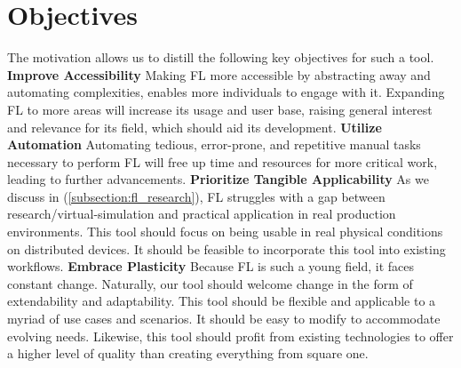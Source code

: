 \section{Objectives}

The motivation allows us to distill the following key objectives for such a tool.
\vspace{5mm}
\newline
\textbf{Improve Accessibility}\newline
Making FL more accessible by abstracting away and automating complexities,
enables more individuals to engage with it.
Expanding FL to more areas will increase its usage and user base,
raising general interest and relevance for its field,
which should aid its development.
\vspace{5mm}
\newline
\textbf{Utilize Automation}\newline
Automating tedious, error-prone, and repetitive manual tasks necessary
to perform FL will free up time and resources for more critical work,
leading to further advancements.
\vspace{5mm}
\newline
\textbf{Prioritize Tangible Applicability}\newline
As we discuss in (\ref{subsection:fl_research}), FL struggles with a gap
between research/virtual-simulation and practical application in real production environments.
This tool should focus on being usable in real physical conditions on distributed devices.
It should be feasible to incorporate this tool into existing workflows.
\vspace{5mm}
\newline
\textbf{Embrace Plasticity}\newline
Because FL is such a young field, it faces constant change.
Naturally, our tool should welcome change in the form of extendability
and adaptability.
This tool should be flexible and applicable to a myriad of use cases and scenarios.
It should be easy to modify to accommodate evolving needs.
Likewise, this tool should profit from existing technologies to offer a higher
level of quality than creating everything from square one.